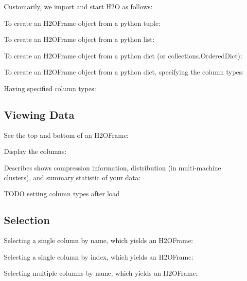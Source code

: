 Customarily, we import and start H2O as follows:


To create an H2OFrame object from a python tuple:


To create an H2OFrame object from a python list:


To create an H2OFrame object from a python dict (or collections.OrderedDict):


To create an H2OFrame object from a python dict, specifying the column types:


Having specified column types:


\subsection{Viewing Data}
See the top and bottom of an H2OFrame:


Display the columns:


Describes shows compression information, distribution (in multi-machine clusters), and summary statistic of your data:
\small

\normalsize

TODO setting column types after load


\subsection{Selection}
Selecting a single column by name, which yields an H2OFrame:


Selecting a single column by index, which yields an H2OFrame:


Selecting multiple columns by name, which yields an H2OFrame:


